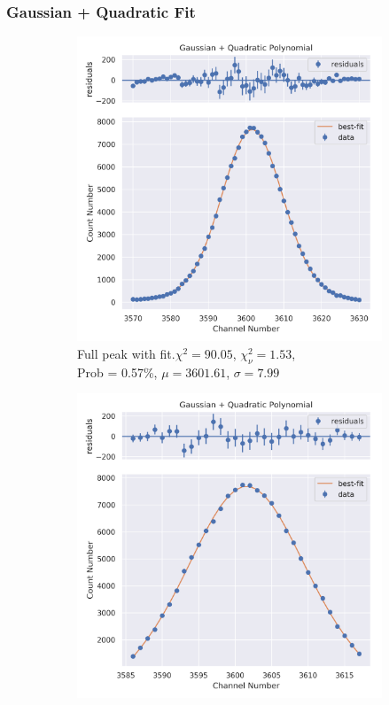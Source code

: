 \documentclass[11pt,a4paper]{article}
\begin{document}
\subsubsection{Gaussian + Quadratic Fit}
\begin{figure}[H]
  \centering
  \begin{subfigure}{.5\linewidth}
    \centering
    \includegraphics[width=\linewidth]{./Images/Sodium22/Quad/Quad_1_Full.png}
    \caption{Full peak with fit.$\chi^2 = 90.05$, $\chi^2_\nu = 1.53$, \\ Prob = 0.57\%, $\mu = 3601.61$, $\sigma = 7.99$}
  \end{subfigure}%
  \begin{subfigure}{.5\linewidth}
    \centering
    \includegraphics[width=\linewidth]{./Images/Sodium22/Quad/Quad_1_Zoom.png}

\end{subfigure}
\end{figure}
\end{document}
